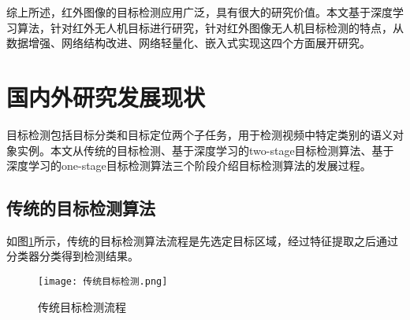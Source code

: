 综上所述，红外图像的目标检测应用广泛，具有很大的研究价值。本文基于深度学习算法，针对红外无人机目标进行研究，针对红外图像无人机目标检测的特点，从数据增强、网络结构改进、网络轻量化、嵌入式实现这四个方面展开研究。

\section{国内外研究发展现状}
目标检测包括目标分类和目标定位两个子任务，用于检测视频中特定类别的语义对象实例。本文从传统的目标检测、基于深度学习的two-stage目标检测算法、基于深度学习的one-stage目标检测算法三个阶段介绍目标检测算法的发展过程\cite{尹宏鹏2016基于视觉的目标检测与跟踪综述}。

\subsection{传统的目标检测算法}
如图\ref{ct}所示，传统的目标检测算法流程是先选定目标区域，经过特征提取之后通过分类器分类得到检测结果。

\begin{figure}[htbp]
    \centering
    \texttt{[image: 传统目标检测.png]}
    \caption{传统目标检测流程}
    \label{ct}
\end{figure}

